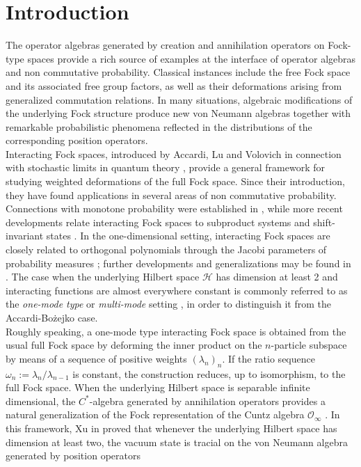 \documentclass[12pt]{amsart}
\numberwithin{equation}{section}
\theoremstyle{definition}
\begin{document}
\section{Introduction}
The operator algebras generated by creation and annihilation operators on Fock-type spaces provide a rich source of examples at the interface of operator algebras and non commutative probability. Classical instances include the free Fock space and its associated free group factors, as well as their deformations arising from generalized commutation relations. In many situations, algebraic modifications of the underlying Fock structure produce new von Neumann algebras together with remarkable probabilistic phenomena reflected in the distributions of the corresponding position operators.\\
Interacting Fock spaces, introduced by Accardi, Lu and Volovich in connection with stochastic limits in quantum theory \cite{ALV}, provide a general framework for studying weighted deformations of the full Fock space. Since their introduction, they have found applications in several areas of non commutative probability. Connections with monotone probability were established in \cite{Lu}, while more recent developments relate interacting Fock spaces to subproduct systems \cite{GS} and shift-invariant states \cite{CDR}. In the one-dimensional setting, interacting Fock spaces are closely related to orthogonal polynomials through the Jacobi parameters of probability measures \cite{AB}; further developments and generalizations may be found in \cite{AL,AHL1,AHL2}.
The case when the underlying Hilbert space $\mathcal H$ has dimension at least 2 and interacting functions are almost everywhere constant is commonly referred to as the \emph{one-mode type} or \emph{multi-mode} setting \cite{ACL, CL}, in order to distinguish it from the Accardi-Bo\.{z}ejko case. \\
Roughly speaking, a one-mode type interacting Fock space is obtained from the usual full Fock space by deforming the inner product on the $n$-particle subspace by means of a sequence of positive weights $(\lambda_n)_n$. If the ratio sequence $\omega_n := \lambda_n / \lambda_{n-1}$ is constant, the construction reduces, up to isomorphism, to the full Fock space. When the underlying Hilbert space is separable infinite dimensional, the $C^*$-algebra generated by annihilation operators provides a natural generalization of the Fock representation of the Cuntz algebra $\mathcal{O}_\infty$ \cite{C}. In this framework, Xu in \cite{Xu} proved that whenever the underlying Hilbert space has dimension at least two, the vacuum state is tracial on the von Neumann algebra generated by position operators
\end{document}
